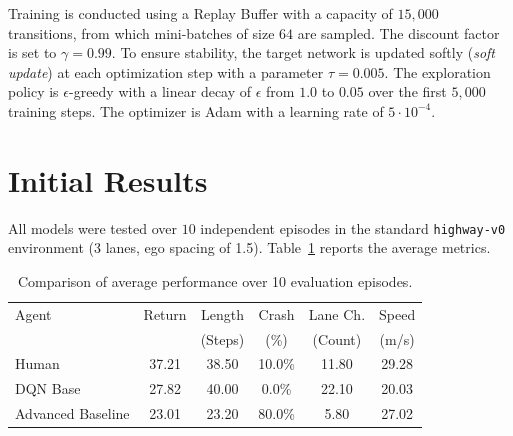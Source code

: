 \documentclass{article}
\begin{document}
Training is conducted using a Replay Buffer with a capacity of $15,000$ transitions, from which mini-batches of size $64$ are sampled. The discount factor is set to $\gamma = 0.99$. To ensure stability, the target network is updated softly (\textit{soft update}) at each optimization step with a parameter $\tau = 0.005$. The exploration policy is $\epsilon$-greedy with a linear decay of $\epsilon$ from $1.0$ to $0.05$ over the first $5,000$ training steps. The optimizer is Adam with a learning rate of $5 \cdot 10^{-4}$.

\section{Initial Results}
All models were tested over $10$ independent episodes in the standard \texttt{highway-v0} environment (3 lanes, ego spacing of 1.5). Table~\ref{tab:initial-results} reports the average metrics.

\begin{table}[ht]
\caption{Comparison of average performance over 10 evaluation episodes.}
\label{tab:initial-results}
\vskip 0.15in
\begin{center}
\begin{small}
\renewcommand{\arraystretch}{1.3}
\setlength{\tabcolsep}{3pt}
\begin{tabular}{lccccc}
\toprule
Agent & Return & Length & Crash & Lane Ch. & Speed \\
 & & (Steps) & (\%) & (Count) & (m/s) \\
\midrule
Human & 37.21 & 38.50 & 10.0\% & 11.80 & 29.28 \\
DQN Base & 27.82 & 40.00 & 0.0\% & 22.10 & 20.03 \\
Advanced Baseline & 23.01 & 23.20 & 80.0\% & 5.80 & 27.02 \\
\bottomrule
\end{tabular}
\end{small}
\end{center}
\vskip -0.1in
\end{table}
\end{document}
